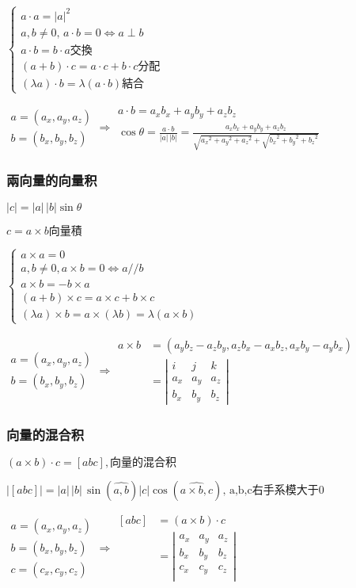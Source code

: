 \documentclass[UTF8]{ctexart}
\newcommand{\mt}[1]{\text{#1}}
\newcommand{\mf}[1]{\left( #1\right)}
\newcommand{\mfa}[1]{\left| #1\right|}
\newcommand{\p}{\par}
\newcommand{\ma}[1]{\begin{array}{llll} #1 \end{array}}
\begin{document}
$ \left\{ \ma{
    a\cdot a=\mfa{a}^2\\
    a,b \neq 0,\,a\cdot b=0 \Leftrightarrow a \perp b\\
    a\cdot b=b\cdot a \mt{交換}\\
    \mf{a+b} \cdot c=a\cdot c+ b\cdot c \mt{分配}\\
    \mf{\lambda a}\cdot b=\lambda \mf{a \cdot b} \mt{結合}
}\right.$\p

$\ma{a=\mf{a_x ,a_y ,a_z}\\b=\mf{b_x ,b_y, b_z}} \Rightarrow \ma{
    a\cdot b=a_xb_x+ a_yb_y+ a_zb_z\\
    \cos \theta=\frac{a\cdot b}{\mfa{a}\,\mfa{b}}=\frac{a_xb_x+ a_yb_y+ a_zb_z}{\sqrt{{a_x}^2 + {a_y}^2 + {a_z}^2}+\sqrt{{b_x}^2 + {b_y}^2 + {b_z}^2}}
}$\p


\subsubsection{兩向量的向量积}

$\mfa{c}=\mfa{a} \,\mfa{b}\sin \theta$\p
$c=a\times  b\mt{向量積}$\p

$\left\{\ma{
    a \times a =0\\
    a,b \neq 0, a \times b =0 \Leftrightarrow a // b \\
    a \times b =- b \times a\\
    \mf{a+b}\times c= a \times c+ b \times c\\
    \mf{\lambda a} \times b = a \times \mf{  \lambda b} =\lambda \mf{a \times  b}
}\right.$\p
$\ma{a=\mf{a_x ,a_y ,a_z}\\b=\mf{b_x ,b_y, b_z}} \Rightarrow \ma{a \times b &=\mf{ a_yb_z-a_zb_y, a_zb_x-a_xb_z,a_xb_y-a_yb_x}\\
    &=\mfa{\ma{
    i    &j    &k \\
    a_x  &a_y  &a_z\\
    b_x  &b_y  &b_z

    }}
}
$\p


\subsubsection{向量的混合积}
$\mf{a\times b} \cdot c=[abc],\mt{向量的混合积}$\p
$\mfa{[abc]}=\mfa{a} \,\mfa{b}\,\sin \mf{\widehat{a,b}} \mfa{c} \cos \mf{\widehat{a\times b,c}},\,\mt{a,b,c右手系模大于}0 $\p
$\ma{a=\mf{a_x ,a_y ,a_z}\\
b=\mf{b_x ,b_y, b_z}\\
c=\mf{c_x ,c_y, c_z}
} \Rightarrow \ma{
    [abc] &=\mf{a\times b} \cdot c\\
         &=\mfa{\ma{
        a_x  &a_y  &a_z\\
        b_x  &b_y  &b_z\\
        c_x  &c_y  &c_z\\
        }}
}
$\p
\end{document}
